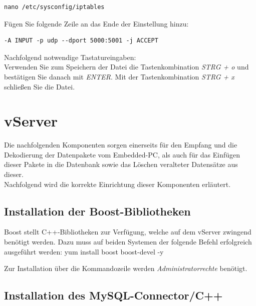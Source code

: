 \documentclass[fontsize = 12pt, paper = a4]{scrreprt}
\begin{document}
\vspace*{4mm}
\begin{lstlisting}[frame=single]
nano /etc/sysconfig/iptables
\end{lstlisting} 
\vspace*{-2mm}

Fügen Sie folgende Zeile an das Ende der Einstellung hinzu:

\vspace*{4mm}
\begin{lstlisting}[frame=single]
-A INPUT -p udp --dport 5000:5001 -j ACCEPT
\end{lstlisting} 
\vspace*{-2mm}

Nachfolgend notwendige Tastatureingaben: \\

Verwenden Sie zum Speichern der Datei die Tastenkombination \textit{STRG + o} und bestätigen Sie danach mit \textit{ENTER}. Mit der Tastenkombination \textit{STRG + x} schließen Sie die Datei. 




\section{vServer}


Die nachfolgenden Komponenten sorgen einerseits für den Empfang und die Dekodierung der Datenpakete vom Embedded-PC, als auch für das Einfügen dieser Pakete in die Datenbank sowie das Löschen veralteter Datensätze aus dieser. \\
Nachfolgend wird die korrekte Einrichtung dieser Komponenten erläutert.

\subsection{Installation der Boost-Bibliotheken}

Boost stellt C++-Bibliotheken zur Verfügung, welche auf dem vServer zwingend benötigt werden.
Dazu muss auf beiden Systemen der folgende Befehl erfolgreich ausgeführt werden:
    yum install boost boost-devel -y
    
Zur Installation über die Kommandozeile werden \textit{Administratorrechte} benötigt.

\subsection{Installation des MySQL-Connector/C++}
\end{document}
